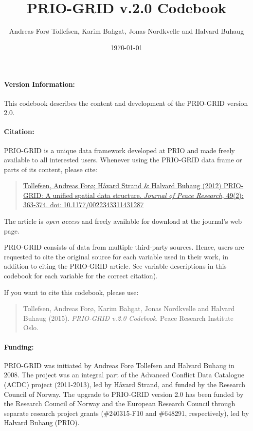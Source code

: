 \documentclass[]{book}
\title{PRIO-GRID v.2.0 Codebook}
\author{Andreas Forø Tollefsen, Karim Bahgat, Jonas Nordkvelle and Halvard
Buhaug}
\date{\today}
\begin{document}
\frontmatter
\maketitle

\paragraph{Version Information:}\label{version-information}

This codebook describes the content and development of the PRIO-GRID
version 2.0.

\paragraph{Citation:}\label{citation}

PRIO-GRID is a unique data framework developed at PRIO and made freely
available to all interested users. Whenever using the PRIO-GRID data
frame or parts of its content, please cite:

\begin{quote}
\href{http://jpr.sagepub.com/content/49/2/363}{Tollefsen, Andreas Forø;
Håvard Strand \& Halvard Buhaug (2012) PRIO-GRID: A unified spatial data
structure. \emph{Journal of Peace Research}, 49(2): 363-374. doi:
10.1177/0022343311431287}
\end{quote}

The article is \emph{open access} and freely available for download at
the journal's web page.

PRIO-GRID consists of data from multiple third-party sources. Hence,
users are requested to cite the original source for each variable used
in their work, in addition to citing the PRIO-GRID article. See variable
descriptions in this codebook for each variable for the correct
citation).

If you want to cite this codebook, please use:

\begin{quote}
Tollefsen, Andreas Forø, Karim Bahgat, Jonas Nordkvelle and Halvard
Buhaug (2015). \emph{PRIO-GRID v.2.0 Codebook}. Peace Research Institute
Oslo.
\end{quote}

\paragraph{Funding:}\label{funding}

PRIO-GRID was initiated by Andreas Forø Tollefsen and Halvard Buhaug in
2008. The project was an integral part of the Advanced Conflict Data
Catalogue (ACDC) project (2011-2013), led by Håvard Strand, and funded
by the Research Council of Norway. The upgrade to PRIO-GRID version 2.0
has been funded by the Research Council of Norway and the European
Research Council through separate research project grants (\#240315-F10
and \#648291, respectively), led by Halvard Buhaug (PRIO).
\end{document}
